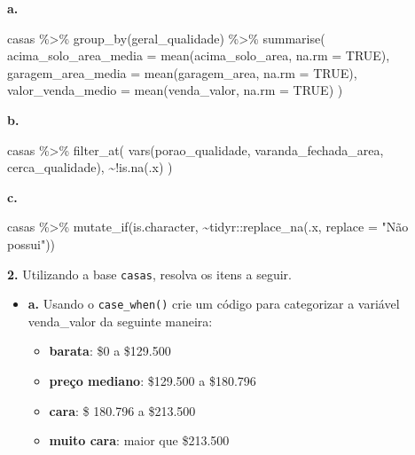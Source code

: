 \documentclass[
]{book}
\newenvironment{Shaded}{\begin{snugshade}}{\end{snugshade}}
\newcommand{\AttributeTok}[1]{\textcolor[rgb]{0.77,0.63,0.00}{#1}}
\newcommand{\ConstantTok}[1]{\textcolor[rgb]{0.00,0.00,0.00}{#1}}
\newcommand{\FunctionTok}[1]{\textcolor[rgb]{0.00,0.00,0.00}{#1}}
\newcommand{\NormalTok}[1]{#1}
\newcommand{\SpecialCharTok}[1]{\textcolor[rgb]{0.00,0.00,0.00}{#1}}
\newcommand{\StringTok}[1]{\textcolor[rgb]{0.31,0.60,0.02}{#1}}
\providecommand{\tightlist}{%
  \setlength{\itemsep}{0pt}\setlength{\parskip}{0pt}}
\begin{document}
\textbf{a.}

\begin{Shaded}
\begin{Highlighting}[]
\NormalTok{casas }\SpecialCharTok{\%\textgreater{}\%}
  \FunctionTok{group\_by}\NormalTok{(geral\_qualidade) }\SpecialCharTok{\%\textgreater{}\%}
  \FunctionTok{summarise}\NormalTok{(}
    \AttributeTok{acima\_solo\_area\_media =} \FunctionTok{mean}\NormalTok{(acima\_solo\_area, }\AttributeTok{na.rm =} \ConstantTok{TRUE}\NormalTok{),}
    \AttributeTok{garagem\_area\_media =} \FunctionTok{mean}\NormalTok{(garagem\_area, }\AttributeTok{na.rm =} \ConstantTok{TRUE}\NormalTok{),}
    \AttributeTok{valor\_venda\_medio =} \FunctionTok{mean}\NormalTok{(venda\_valor, }\AttributeTok{na.rm =} \ConstantTok{TRUE}\NormalTok{)}
\NormalTok{  )}
\end{Highlighting}
\end{Shaded}

\textbf{b.}

\begin{Shaded}
\begin{Highlighting}[]
\NormalTok{casas }\SpecialCharTok{\%\textgreater{}\%}
  \FunctionTok{filter\_at}\NormalTok{(}
    \FunctionTok{vars}\NormalTok{(porao\_qualidade, varanda\_fechada\_area, cerca\_qualidade),}
    \SpecialCharTok{\textasciitilde{}!}\FunctionTok{is.na}\NormalTok{(.x)}
\NormalTok{  )}
\end{Highlighting}
\end{Shaded}

\textbf{c.}

\begin{Shaded}
\begin{Highlighting}[]
\NormalTok{casas }\SpecialCharTok{\%\textgreater{}\%}
  \FunctionTok{mutate\_if}\NormalTok{(is.character, }\SpecialCharTok{\textasciitilde{}}\NormalTok{tidyr}\SpecialCharTok{::}\FunctionTok{replace\_na}\NormalTok{(.x, }\AttributeTok{replace =} \StringTok{"Não possui"}\NormalTok{))}
\end{Highlighting}
\end{Shaded}

\textbf{2.} Utilizando a base \texttt{casas}, resolva os itens a seguir.

\begin{itemize}
\item
  \textbf{a.} Usando o \texttt{case\_when()} crie um código para categorizar a variável venda\_valor da seguinte maneira:

  \begin{itemize}
  \tightlist
  \item
    \textbf{barata}: \$0 a \$129.500\\
  \item
    \textbf{preço mediano}: \$129.500 a \$180.796
  \item
    \textbf{cara}: \$ 180.796 a \$213.500
  \item
    \textbf{muito cara}: maior que \$213.500
  \end{itemize}
\end{itemize}
\end{document}
